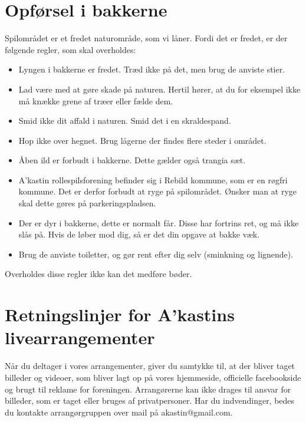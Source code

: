 \section*{Opførsel i bakkerne}
Spilområdet er et fredet naturområde, som vi låner. Fordi det er fredet, er der følgende regler, som skal overholdes:
\begin{itemize}
    \item Lyngen i bakkerne er fredet. Træd ikke på det, men brug de anviste stier.
    \item Lad være med at gøre skade på naturen. Hertil hører, at du for eksempel ikke må knække grene af træer eller fælde dem.
    \item Smid ikke dit affald i naturen. Smid det i en skraldespand.
    \item Hop ikke over hegnet. Brug lågerne der findes flere steder i området.
    \item Åben ild er forbudt i bakkerne. Dette gælder også trangia sæt.
    \item A’kastin rollespilsforening befinder sig i Rebild kommune, som er en røgfri kommune. Det er derfor forbudt at ryge på spilområdet. Ønsker man at ryge skal dette gøres på parkeringspladsen.
    \item Der er dyr i bakkerne, dette er normalt får. Disse har fortrins ret, og må ikke slås på. Hvis de løber mod dig, så er det din opgave at bakke væk.
    \item Brug de anviste toiletter, og gør rent efter dig selv (sminkning og lignende).
\end{itemize}
Overholdes disse regler ikke kan det medføre bøder.

\section*{Retningslinjer for A’kastins livearrangementer}
Når du deltager i vores arrangementer, giver du samtykke til, at der bliver taget billeder og videoer, som bliver lagt op på vores hjemmeside, officielle facebookside og brugt til reklame for foreningen. Arrangørerne kan ikke drages til ansvar for billeder, som er taget eller bruges af privatpersoner. Har du indvendinger, bedes du kontakte arrangørgruppen over mail på akastin@gmail.com.